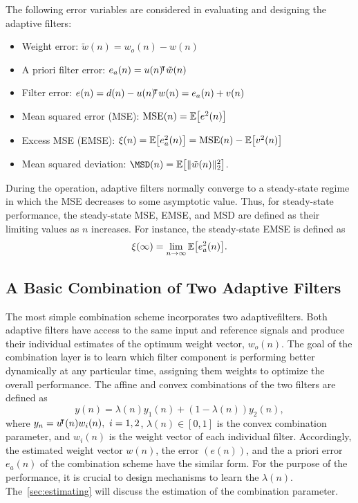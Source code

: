\documentclass[11pt]{article}
\begin{document}
The following error variables are considered in evaluating and designing the adaptive filters:
\begin{itemize}
    \item Weight error: $\tilde{w}(n)=w_o(n)-w(n)$
    \item A priori filter error: $e_a(n)=u(n){}^{\mkern-4mu\intercal}\tilde{w}(n)$
    \item Filter error: $e(n)=d(n)-u(n){}^{\mkern-4mu\intercal} w(n)=e_a(n)+v(n)$
    \item Mean squared error (MSE): $\MSE(n)=\E{e^2(n)}$
    \item Excess MSE (EMSE): $\xi(n)=\E{e_a^2(n)}=\MSE(n)-\E{v^2(n)}$
    \item Mean squared deviation: $\MSD(n)=\E{\norm{\tilde{w}(n)}_2^2}$.
\end{itemize}
During the operation, adaptive filters normally converge to a steady-state regime in which the MSE decreases to some asymptotic value. Thus, for steady-state performance, the steady-state MSE, EMSE, and MSD are defined as their limiting values as $n$ increases. For instance, the steady-state EMSE is defined as
\begin{equation}
    \xi(\infty)=\lim_{n\rightarrow\infty}\E{e_a^2(n)}.
\end{equation}

\subsection{A Basic Combination of Two Adaptive Filters}
The most simple combination scheme incorporates two adaptivefilters.
Both adaptive filters have access to the same input and reference signals and produce their individual estimates of the optimum weight vector, $w_o(n)$.
The goal of the combination layer is to learn which filter component is performing better dynamically at any particular time, assigning them weights to optimize the overall performance.
The affine and convex combinations of the two filters are defined as
\begin{equation}\label{eq:affine_combination}
    y(n)=\lambda(n)y_1(n)+(1-\lambda(n))y_2(n),
\end{equation}
where $y_n=u{}^{\mkern-4mu\intercal}(n)w_i(n),\ i=1,2$, $\lambda(n) \in [0,1]$ is the convex combination parameter, and $w_i(n)$ is the weight vector of each individual filter. Accordingly, the estimated weight vector $w(n)$, the error $(e(n))$, and the a priori error $e_a(n)$ of the combination scheme have the similar form. For the purpose of the performance, it is crucial to design mechanisms to learn the $\lambda(n)$. The~\cref{sec:estimating} will discuss the estimation of the combination parameter.
\end{document}
